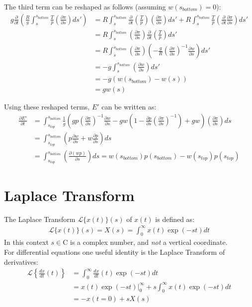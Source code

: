 The third term can be reshaped as follows (assuming $w(s_{bottom})=0$):
\begin{align*}
g\frac{\partial}{\partial t}\left(\frac{R}{g}\int _s ^{s_{bottom}} \frac{T}{p}\left(\frac{\partial \pi}{\partial s}\right)ds'\right) &= R\int _s ^{s_{bottom}} \frac{\partial}{\partial t}\left(\frac{T}{p}\right)\left(\frac{\partial \pi}{\partial s}\right)ds' + R\int _s ^{s_{bottom}} \frac{T}{p}\left(\frac{\partial}{\partial t}\frac{\partial \pi}{\partial s}\right)ds'\\
&= R\int _s ^{s_{bottom}} \left(\frac{\partial \pi}{\partial s}\right)\frac{\partial}{\partial t}\left(\frac{T}{p}\right)ds'\\
&= R\int _s ^{s_{bottom}} \left(\frac{\partial \pi}{\partial s}\right)\left(-\frac{g}{R}\left(\frac{\partial\pi}{\partial s}\right)^{-1}\frac{\partial w}{\partial s}\right)ds'\\
&= -g\int _s ^{s_{bottom}} \left(\frac{\partial w}{\partial s}\right)ds'\\
&= -g\left( w(s_{bottom}) - w(s) \right)\\
&= gw(s)
\end{align*}

Using these reshaped terms, $E'$ can be written as:
\begin{align*}
\frac{\partial E'}{\partial t} &= \int_{s_{top}}^{s_{bottom}} \frac{1}{g}\left(gp\left(\frac{\partial \pi}{\partial s}\right)^{-1} \frac{\partial w}{\partial s}-gw\left(1 - \frac{\partial p}{\partial s}\left(\frac{\partial \pi}{\partial s}\right)^{-1}\right)+gw \right)\left( \frac{\partial \pi}{\partial s} \right) ds\\
&=\int_{s_{top}}^{s_{bottom}} \left(p \frac{\partial w}{\partial s}+w\frac{\partial p}{\partial s}\right) ds\\
&=\int_{s_{top}}^{s_{bottom}} \left(\frac{\partial (wp)}{\partial s}\right) ds = w(s_{bottom})p(s_{bottom})-w(s_{top})p(s_{top})
\end{align*}

\section{Laplace Transform}\label{sec:laplace_trafo}
The Laplace Transform $\mathcal{L}\{x(t)\}(s)$ of $x(t)$ is defined as:
\begin{align*}
\mathcal{L}\{x(t)\}(s)=X(s)=\int_0^\infty x(t)\exp (-st)dt
\end{align*}
In this context $s\in \mathrm{C}$ is a complex number, and \emph{not} a vertical coordinate.\\
For differential equations one useful identity is the Laplace Transform of derivatives:
\begin{align*}
\mathcal{L} \left\{ \frac{dx}{dt}(t) \right\} &=\int_0^\infty \frac{dx}{dt}(t)\exp (-st)dt\\
&=x(t)\exp(-st)\rvert _0^\infty + s  \int_0^\infty x(t)\exp (-st)dt\\
&=-x(t=0) + sX(s)
\end{align*}

